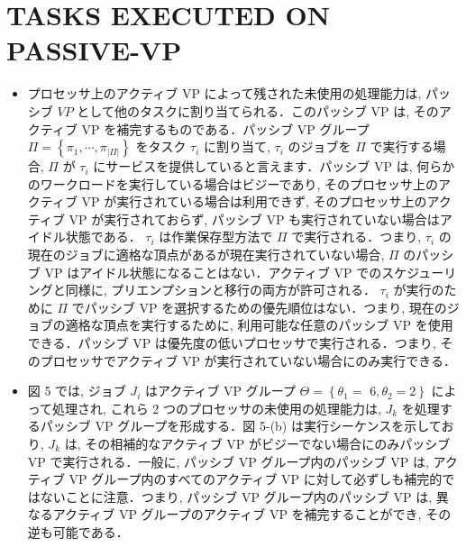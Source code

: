
\section{TASKS EXECUTED ON PASSIVE-VP}
\label{sec: tasks executed on passive-vp}

\begin{frame}{}
    \begin{itemize}
        \item プロセッサ上のアクティブ VP によって残された未使用の処理能力は, パッシブ $V P$ として他のタスクに割り当てられる．このパッシブ VP は, そのアクティブ VP を補完するものである．パッシブ VP グループ $\Pi=\left\{\pi_{1}, \cdots, \pi_{|\Pi|}\right\}$ をタスク $\tau_{i}$ に割り当て, $\tau_{i}$ のジョブを $\Pi$ で実行する場合, $\Pi$ が $\tau_{i}$ にサービスを提供していると言えます．パッシブ VP は, 何らかのワークロードを実行している場合はビジーであり, そのプロセッサ上のアクティブ VP が実行されている場合は利用できず, そのプロセッサ上のアクティブ VP が実行されておらず, パッシブ VP も実行されていない場合はアイドル状態である． $\tau_{i}$ は作業保存型方法で $\Pi$ で実行される．つまり, $\tau_{i}$ の現在のジョブに適格な頂点があるが現在実行されていない場合, $\Pi$ のパッシブ VP はアイドル状態になることはない．アクティブ VP でのスケジューリングと同様に, プリエンプションと移行の両方が許可される． $\tau_{i}$ が実行のために $\Pi$ でパッシブ VP を選択するための優先順位はない．つまり, 現在のジョブの適格な頂点を実行するために, 利用可能な任意のパッシブ VP を使用できる．パッシブ VP は優先度の低いプロセッサで実行される．つまり, そのプロセッサでアクティブ VP が実行されていない場合にのみ実行できる．
    \end{itemize}
\end{frame}

\begin{frame}{}
    \begin{itemize}
        \item 図 5 では, ジョブ $J_{i}$ はアクティブ VP グループ $\Theta=\left\{\theta_{1}=\right.$  $\left.6, \theta_{2}=2\right\}$ によって処理され, これら 2 つのプロセッサの未使用の処理能力は, $J_{k}$ を処理するパッシブ VP グループを形成する．図 5-(b) は実行シーケンスを示しており, $J_{k}$ は, その相補的なアクティブ VP がビジーでない場合にのみパッシブ VP で実行される．一般に, パッシブ VP グループ内のパッシブ VP は, アクティブ VP グループ内のすべてのアクティブ VP に対して必ずしも補完的ではないことに注意．つまり, パッシブ VP グループ内のパッシブ VP は, 異なるアクティブ VP グループのアクティブ VP を補完することができ, その逆も可能である．
    \end{itemize}
\end{frame}

